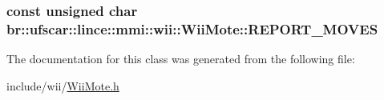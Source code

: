 \label{classbr_1_1ufscar_1_1lince_1_1mmi_1_1wii_1_1WiiMote_af1e2bc7d7054d1b4dab67e9b278017ce}
\hypertarget{classbr_1_1ufscar_1_1lince_1_1mmi_1_1wii_1_1WiiMote_a95ac41c7b1b12e770e2adf6f12f48143}{
\subsubsection[{REPORT\_\-MOVES}]{\setlength{\rightskip}{0pt plus 5cm}const unsigned char {\bf br::ufscar::lince::mmi::wii::WiiMote::REPORT\_\-MOVES}}}
\label{classbr_1_1ufscar_1_1lince_1_1mmi_1_1wii_1_1WiiMote_a95ac41c7b1b12e770e2adf6f12f48143}


The documentation for this class was generated from the following file:\begin{DoxyCompactItemize}
\item 
include/wii/\hyperlink{WiiMote_8h}{WiiMote.h}\end{DoxyCompactItemize}
